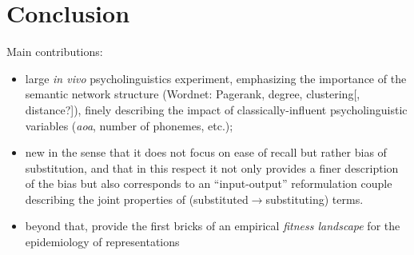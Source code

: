 \section{Conclusion}\label{sec:conclusion}

Main contributions:
\begin{itemize}
\item large \emph{in vivo} psycholinguistics experiment, emphasizing the importance of the semantic network structure (Wordnet: Pagerank, degree, clustering[, distance?]), finely describing the impact of classically-influent psycholinguistic variables (\emph{aoa}, number of phonemes, etc.); 
\item new in the sense that it does not focus on ease of recall but rather bias of substitution, and that in this respect it not only provides a finer description of the bias but also corresponds to an  ``input-output'' reformulation couple describing the joint properties of (substituted$\rightarrow$substituting) terms.
\item beyond that, provide the first bricks of an empirical \emph{fitness landscape} for the epidemiology of representations
\end{itemize}

